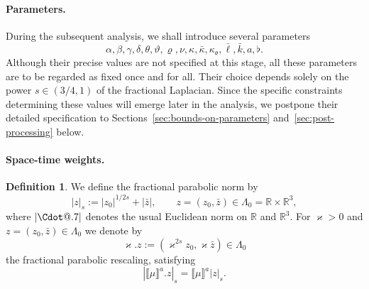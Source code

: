 \documentclass{article}
\makeatletter
\numberwithin{equation}{section}
\newcommand{\assign}{:=}
\newcommand*\Cdot{{\mathpalette\Cdot@{.7}}}
\newcommand*\Cdot@[2]{\mathbin{\vcenter{\hbox{\scalebox{#2}{\hspace{0.1mm}$\m@th#1\bullet$\hspace{0.1mm}}}}}}
\theoremstyle{plain}
\theoremstyle{definition}
\newtheorem{definition}[theorem]{Definition}
\makeatother
\begin{document}
\paragraph*{Parameters.} During the subsequent analysis, we
shall introduce several parameters
\begin{equation}
  \alpha, \beta, \gamma, \delta, \theta, \vartheta, \varrho, \nu, \kappa,
  \bar{\kappa}, \kappa_{\mathfrak{o}}, \bar{\ell}, \bar{k}, a, \flat .
  \label{eq:parameters}
\end{equation}
Although their precise values are not specified at this stage, all these
parameters are to be regarded as fixed once and for all. Their choice depends
solely on the power $s \in (3 / 4, 1)$ of the fractional Laplacian. Since the
specific constraints determining these values will emerge later in the
analysis, we postpone their detailed specification to
Sections~\ref{sec:bounds-on-parameters} and~\ref{sec:post-processing}
below.

\paragraph*{Space-time weights.}

\begin{definition}
  \label{def:distance}We define the fractional parabolic norm by
  \begin{equation}
    | z |_s \assign | z_0 |^{1 / 2 s} + {| \bar{z} | } , \qquad z = (z_0,
    \bar{z}) \in \Lambda_0 =\mathbb{R} \times \mathbb{R}^3,
    \label{eq:dist-parabolic}
  \end{equation}
  where $| \Cdot |$ denotes the usual Euclidean norm on $\mathbb{R}$ and
  $\mathbb{R}^3$. For $\varkappa > 0$ and $z = (z_0, \bar{z}) \in \Lambda_0$
  we denote by
  \[ \varkappa .z \assign (\varkappa^{2 s} z_0, \varkappa \bar{z}) \in
     \Lambda_0 \]
  the fractional parabolic rescaling, satisfying
  \[ | \llbracket \mu \rrbracket^a .z |_s = \llbracket \mu \rrbracket^a | z
     |_s . \]
\end{definition}
\end{document}
